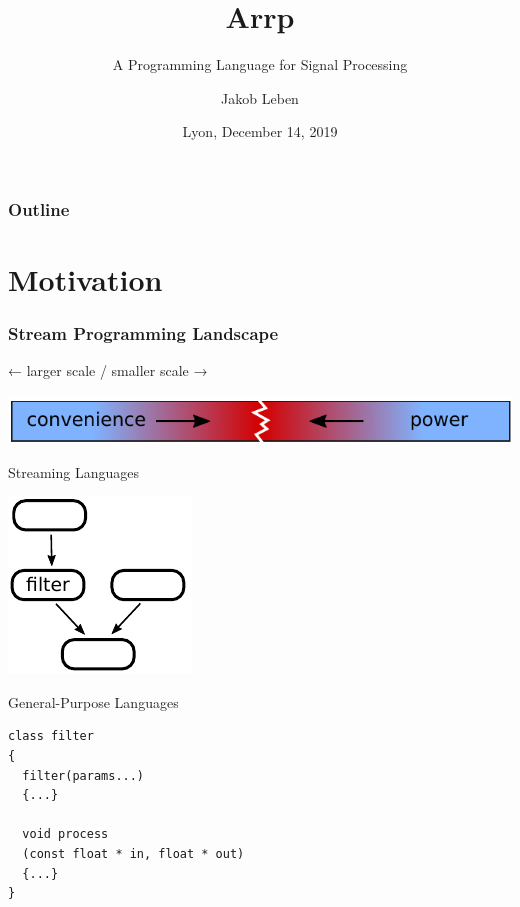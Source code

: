 \documentclass{beamer}
\title{Arrp}
\subtitle{A Programming Language for Signal Processing}
\author{Jakob Leben}
\institute{Limbic Media, Victoria, Canada}
\date{Lyon, December 14, 2019}
\begin{document}
\begin{frame}
\titlepage
\end{frame}

\begin{frame}
\frametitle{Outline}
\tableofcontents
\end{frame}

\section{Motivation}

\begin{frame}[t, fragile]
\frametitle{Stream Programming Landscape}

\begin{center}
← larger scale / smaller scale →

\includegraphics{../figures/landscape_before_arrp}
\end{center}
\begin{minipage}[t]{0.48\linewidth}
Streaming Languages

\vspace{10pt}
\begin{center}
\includegraphics{../figures/stream-graph}
\end{center}
\end{minipage}\hfill
\begin{minipage}[t]{0.48\linewidth}
General-Purpose Languages

\vspace{10pt}
\small
\begin{BVerbatim}
class filter
{
  filter(params...)
  {...}

  void process
  (const float * in, float * out)
  {...}
}
\end{BVerbatim}
\end{minipage}
\end{frame}
\end{document}
